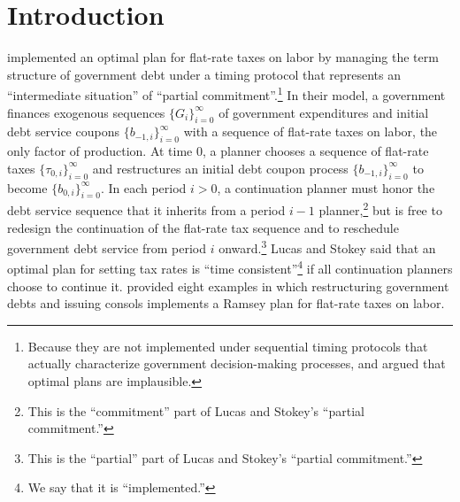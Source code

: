 \documentclass[12pt]{article}
\newcommand{\NW}[1]{{\textcolor{blue}{#1}}}
\begin{document}
\clearpage


%	
%
%

\section{Introduction}



	\citet{LucasStokey1983}    implemented an optimal plan for flat-rate taxes on labor   by managing the  
	term structure of government debt under a timing protocol that represents  an  ``intermediate situation''  of ``partial commitment''.\footnote{Because  they are not implemented under    sequential timing protocols that 
	actually characterize  government decision-making processes, \citet{kydland1977rules} and  \citet{calvo1978time} argued 
	that optimal  plans are implausible.   }   In  their %
	model, a government   finances exogenous  sequences  $ \{G_{i}\}_{i=0}^{\infty}$ of  government expenditures and initial debt service coupons $ \{b_{-1,i}\}_{i=0}^{\infty}$ with a sequence
	 of flat-rate taxes on labor, the only factor of  production. %
	{At time $0$,  a planner chooses a sequence  of flat-rate taxes $\{\tau_{0, i}\}_{i=0}^{\infty}$ and   restructures an initial  debt  coupon process  $ \{b_{-1,i}\}_{i=0}^{\infty}$ to become $\{{b}_{0, i}\}_{i=0}^{\infty}$. In each  period $ i >  0$, a continuation  planner must  honor  the  debt service sequence  that it inherits from a period $i-1$ planner,}\footnote{This is the ``commitment'' part of Lucas and Stokey's ``partial commitment.''} but is  free to  redesign the continuation of  the  flat-rate tax sequence and  to reschedule government debt service from period $i $ onward.\footnote{This is the ``partial'' part of Lucas and Stokey's ``partial commitment.''}  Lucas and Stokey said that  an optimal  plan for setting tax rates  is ``time consistent''\footnote{We say that it is ``implemented.''} if all continuation planners choose to continue it.  {  \citet[Sec.~3]{LucasStokey1983}  
	provided eight examples in which restructuring government debts and issuing consols  
	implements a Ramsey plan for flat-rate taxes on labor.
	}
	
\end{document}
